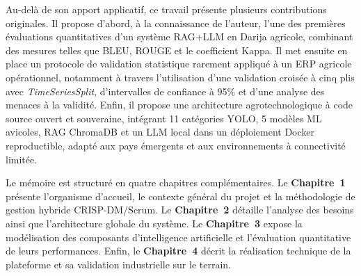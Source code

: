 Au-delà de son apport applicatif, ce travail présente plusieurs contributions
originales. Il propose d'abord, à la connaissance de l'auteur, l'une des premières
évaluations quantitatives d'un système RAG+LLM en Darija agricole, combinant des
mesures telles que BLEU, ROUGE et le coefficient Kappa. Il met ensuite en place
un protocole de validation statistique rarement appliqué à un ERP agricole
opérationnel, notamment à travers l'utilisation d'une validation croisée à cinq plis
avec \textit{TimeSeriesSplit}, d'intervalles de confiance à 95\% et d'une analyse
des menaces à la validité. Enfin, il propose une architecture agrotechnologique
à code source ouvert et souveraine, intégrant 11 catégories YOLO, 5 modèles ML avicoles,
RAG ChromaDB et un LLM local dans un déploiement Docker reproductible, adapté
aux pays émergents et aux environnements à connectivité limitée.

Le mémoire est structuré en quatre chapitres complémentaires. Le
\textbf{Chapitre~1} présente l'organisme d'accueil, le contexte général du projet
et la méthodologie de gestion hybride CRISP-DM/Scrum. Le \textbf{Chapitre~2}
détaille l'analyse des besoins ainsi que l'architecture globale du système. Le
\textbf{Chapitre~3} expose la modélisation des composants d'intelligence
artificielle et l'évaluation quantitative de leurs performances. Enfin, le
\textbf{Chapitre~4} décrit la réalisation technique de la plateforme et sa
validation industrielle sur le terrain.

